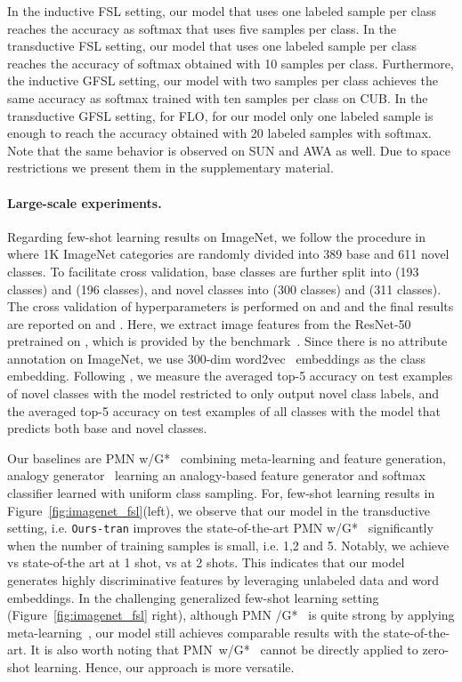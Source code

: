 \documentclass[10pt,twocolumn,letterpaper]{article}
\begin{document}
In the inductive FSL setting, our model that uses one labeled sample per class reaches the accuracy as softmax that uses five samples per class. In the transductive FSL setting, our model that uses one labeled sample per class reaches the accuracy of softmax obtained with 10 samples per class. Furthermore, the inductive GFSL setting, our model with two samples per class achieves the same accuracy as softmax trained with ten samples per class on CUB. In the transductive GFSL setting, for FLO, for our model only one labeled sample is enough to reach the accuracy obtained with 20 labeled samples with softmax. Note that the same behavior is observed on SUN and AWA as well. Due to space restrictions we present them in the supplementary material.

\paragraph{Large-scale experiments.} 
Regarding few-shot learning results on ImageNet, we follow the procedure in~\cite{HG16} where 1K ImageNet categories are randomly divided into 389 base and 611 novel classes. To facilitate cross validation, base classes are further split into  (193 classes) and  (196 classes), and novel classes into  (300 classes) and  (311 classes). The cross validation of hyperparameters is performed on   and  and the final results are reported on   and . Here, we extract image features from the ResNet-50 pretrained on , which is provided by the benchmark~\cite{HG16}. Since there is no attribute annotation on ImageNet, we use 300-dim word2vec~\cite{MSCCD13} embeddings as the class embedding. Following \cite{wang2018low}, we measure the averaged top-5 accuracy on test examples of novel classes with the model restricted to only output novel class labels, and the averaged top-5 accuracy on test examples of all classes with the model that predicts both base and novel classes. 

Our baselines are PMN w/G*~\cite{wang2018low} combining meta-learning and feature generation, analogy generator~\cite{HG16} learning an analogy-based feature generator and softmax classifier learned with uniform class sampling. For, few-shot learning results in Figure~\ref{fig:imagenet_fsl}(left), we observe that our model in the transductive setting, i.e. \texttt{Ours-tran} improves the state-of-the-art PMN w/G*~\cite{wang2018low} significantly when the number of training samples is small, i.e. 1,2 and 5. Notably, we achieve  vs  state-of-the art at 1 shot,  vs  at 2 shots. This indicates that our model generates highly discriminative features by leveraging unlabeled data and word embeddings. In the challenging generalized few-shot learning setting (Figure~\ref{fig:imagenet_fsl} right), although PMN /G*~\cite{wang2018low} is quite strong by applying meta-learning~\cite{snell2017prototypical}, our model still achieves comparable results with the state-of-the-art. It is also worth noting that PMN~w/G*~\cite{wang2018low} cannot be directly applied to zero-shot learning. Hence, our approach is more versatile.
\end{document}

